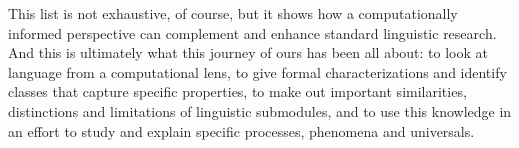 This list is not exhaustive, of course, but it shows how a computationally informed perspective can complement and enhance standard linguistic research.
And this is ultimately what this journey of ours has been all about: to look at language from a computational lens, to give formal characterizations and identify classes that capture specific properties, to make out important similarities, distinctions and limitations of linguistic submodules, and to use this knowledge in an effort to study and explain specific processes, phenomena and universals.
